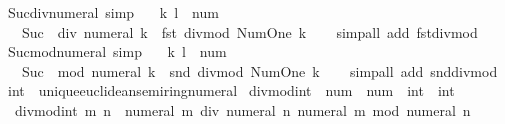 \begin{isabellebody}
\isanewline
{}\isamarkupfalse%
\ Suc{\isacharunderscore}{\kern0pt}{}{\isacharunderscore}{\kern0pt}div{\isacharunderscore}{\kern0pt}numeral\ {\isacharbrackleft}{\kern0pt}simp{\isacharbrackright}{\kern0pt}{\isacharcolon}{\kern0pt}\isanewline
\ \ \ k\ l\ {\isacharcolon}{\kern0pt}{\isacharcolon}{\kern0pt}\ num\isanewline
\ \ \ {\isachardoublequoteopen}Suc\ {}\ div\ numeral\ k\ {\isacharequal}{\kern0pt}\ fst\ {\isacharparenleft}{\kern0pt}divmod\ Num{\isachardot}{\kern0pt}One\ k{\isacharparenright}{\kern0pt}{\isachardoublequoteclose}\isanewline
%
\isadelimproof
\ \ %
\endisadelimproof
%
\isatagproof
{}\isamarkupfalse%
\ {\isacharparenleft}{\kern0pt}simp{\isacharunderscore}{\kern0pt}all\ add{\isacharcolon}{\kern0pt}\ fst{\isacharunderscore}{\kern0pt}divmod{\isacharparenright}{\kern0pt}%
\endisatagproof
{\isafoldproof}%
%
\isadelimproof
\isanewline
%
\endisadelimproof
\isanewline
{}\isamarkupfalse%
\ Suc{\isacharunderscore}{\kern0pt}{}{\isacharunderscore}{\kern0pt}mod{\isacharunderscore}{\kern0pt}numeral\ {\isacharbrackleft}{\kern0pt}simp{\isacharbrackright}{\kern0pt}{\isacharcolon}{\kern0pt}\isanewline
\ \ \ k\ l\ {\isacharcolon}{\kern0pt}{\isacharcolon}{\kern0pt}\ num\isanewline
\ \ \ {\isachardoublequoteopen}Suc\ {}\ mod\ numeral\ k\ {\isacharequal}{\kern0pt}\ snd\ {\isacharparenleft}{\kern0pt}divmod\ Num{\isachardot}{\kern0pt}One\ k{\isacharparenright}{\kern0pt}{\isachardoublequoteclose}\isanewline
%
\isadelimproof
\ \ %
\endisadelimproof
%
\isatagproof
{}\isamarkupfalse%
\ {\isacharparenleft}{\kern0pt}simp{\isacharunderscore}{\kern0pt}all\ add{\isacharcolon}{\kern0pt}\ snd{\isacharunderscore}{\kern0pt}divmod{\isacharparenright}{\kern0pt}%
\endisatagproof
{\isafoldproof}%
%
\isadelimproof
\isanewline
%
\endisadelimproof
\isanewline
{}\isamarkupfalse%
\ int\ {\isacharcolon}{\kern0pt}{\isacharcolon}{\kern0pt}\ unique{\isacharunderscore}{\kern0pt}euclidean{\isacharunderscore}{\kern0pt}semiring{\isacharunderscore}{\kern0pt}numeral\isanewline
{}\isanewline
\isanewline
{}\isamarkupfalse%
\ divmod{\isacharunderscore}{\kern0pt}int\ {\isacharcolon}{\kern0pt}{\isacharcolon}{\kern0pt}\ {\isachardoublequoteopen}num\ {\isasymRightarrow}\ num\ {\isasymRightarrow}\ int\ {\isasymtimes}\ int{\isachardoublequoteclose}\isanewline
{}\isanewline
\ \ {\isachardoublequoteopen}divmod{\isacharunderscore}{\kern0pt}int\ m\ n\ {\isacharequal}{\kern0pt}\ {\isacharparenleft}{\kern0pt}numeral\ m\ div\ numeral\ n{\isacharcomma}{\kern0pt}\ numeral\ m\ mod\ numeral\ n{\isacharparenright}{\kern0pt}{\isachardoublequoteclose}\isanewline

\end{isabellebody}
